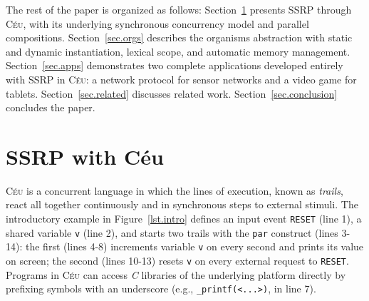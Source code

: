 \documentclass{sigplanconf}
\newcommand{\CEU}{\textsc{C\'{e}u}\xspace}
\newcommand{\code}[1] {{\small{\texttt{#1}}}}
\newcommand{\1}{\;}
\newcommand{\2}{\;\;}
\newcommand{\3}{\;\;\;}
\newcommand{\5}{\;\;\;\;\;}
\begin{document}

The rest of the paper is organized as follows:
Section~\ref{sec.ceu} presents SSRP through \CEU, with its underlying 
synchronous concurrency model and parallel compositions.
Section~\ref{sec.orgs} describes the organisms abstraction with static and 
dynamic instantiation, lexical scope, and automatic memory management.
Section~\ref{sec.apps} demonstrates two complete applications developed 
entirely with SSRP in \CEU: a network protocol for sensor networks and a video 
game for tablets.
Section~\ref{sec.related} discusses related work.
Section~\ref{sec.conclusion} concludes the paper.

\section{SSRP with C\'eu}
\label{sec.ceu}

\CEU is a concurrent language in which the lines of execution, known as 
\emph{trails}, react all together continuously and in synchronous steps to 
external stimuli.
%
%
The introductory example in Figure~\ref{lst.intro} defines an input event 
\code{RESET} (line 1), a shared variable \code{v} (line 2), and starts two 
trails with the \code{par} construct (lines 3-14): the first (lines 4-8) 
increments variable \code{v} on every second and prints its value on screen; 
the second (lines 10-13) resets \code{v} on every external request to 
\code{RESET}.
%
%
Programs in \CEU can access \emph{C} libraries of the underlying platform 
directly by prefixing symbols with an underscore (e.g., \code{\_printf(<...>)}, 
in line 7).
\end{document}
